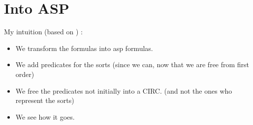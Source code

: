 \section{Into ASP}\label{sec:asp}

My intuition (based on \cite{circ}) :
\begin{itemize}
  \item We transform the formulas into asp formulas.
  \item We add predicates for the sorts (since we can, now that we are free from first order)
  \item We free the predicates not initially into a CIRC. (and not the ones who represent the sorts)
  \item We see how it goes.
\end{itemize}

